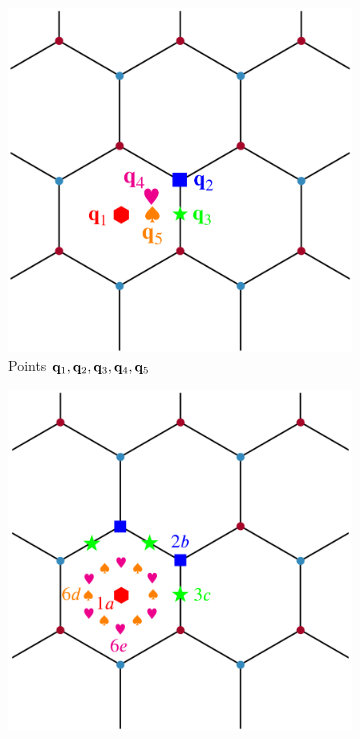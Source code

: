 \begin{figure}[H]
\centering
\begin{subfigure}{.3\textwidth}
  \centering
  \includegraphics[width=\linewidth]{fig/unitcell_q1q2q3q4q5.png}
  \caption{Points ${\vb{q}}_1,{\vb{q}}_2,{\vb{q}}_3,{\vb{q}}_4,{\vb{q}}_5$}
  \label{fig:unitcell_q1q2q3q4q5}
\end{subfigure}
\hfill
\begin{subfigure}{.3\textwidth}
  \centering
  \includegraphics[width=\linewidth]{fig/unitcell_orbitsymbols.png}

\end{subfigure}
\end{figure}

